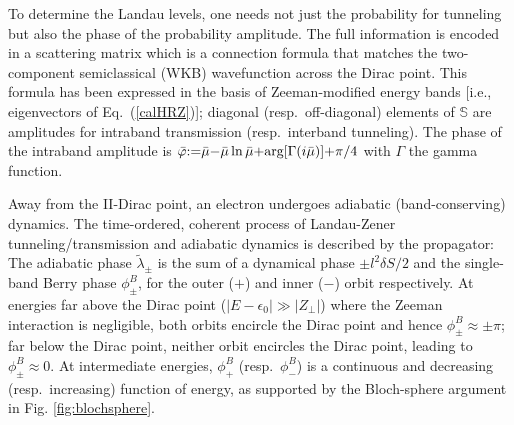 \documentclass[aps, prb, showpacs, twocolumn, notitlepage, superscriptaddress]{revtex4-1}
\begin{document}
To determine the Landau levels, one needs not just the probability for tunneling but also the phase of the probability amplitude. The full information is encoded in a scattering matrix\cite{AALG,kaganov_coherent_1983}
which is a connection formula that matches the two-component semiclassical (WKB) wavefunction across the Dirac point. This formula  has been expressed in the basis of Zeeman-modified energy bands [i.e., eigenvectors of Eq.\ (\ref{calHRZ})]; diagonal (resp.\ off-diagonal) elements of $\mathbb{S}$ are amplitudes for intraband transmission (resp.\ interband tunneling). The phase of the intraband amplitude is $\bar{\varphi}{:}{=}\bar{\mu}{-}\bar{\mu}\ln\bar{\mu}{+}\text{arg}[\Gamma(i\bar{\mu})]{+}\pi/4$ with $\Gamma$ the gamma function.

Away from the II-Dirac point, an electron undergoes adiabatic (band-conserving) dynamics. The time-ordered, coherent process of Landau-Zener tunneling/transmission and adiabatic dynamics is described by the propagator:
The adiabatic phase $\tilde{\lambda}_{\pm}$ is the sum of a dynamical phase ${\pm} l^2 \delta S/2$ and  the single-band Berry phase $\phi^B_\pm$, for the outer ($+$) and inner ($-$) orbit respectively. At energies far above the Dirac point ($|E{-}\epsilon_0|{\gg}|Z_{\perp}|$) where the Zeeman interaction is negligible, both orbits encircle the Dirac point and hence $\phi_{\pm}^B{\approx}{\pm}\pi$; far below the Dirac point, neither orbit encircles the Dirac point, leading to $\phi_{\pm}^B{\approx}0$. At intermediate energies, $\phi_{+}^B$ (resp.\ $\phi_{-}^B$) is a continuous and decreasing (resp.\ increasing) function of energy, as supported by the Bloch-sphere argument in Fig. \ref{fig:blochsphere}.



\end{document}
